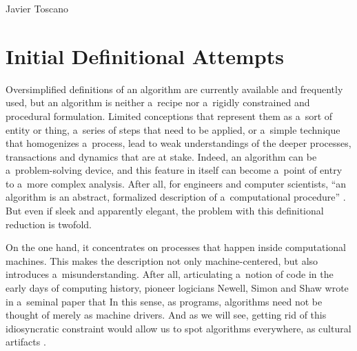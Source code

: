 \begin{artengenv}{Javier Toscano}
\section*{Initial Definitional Attempts}
Oversimplified definitions of an algorithm are currently available and frequently used, but an algorithm is neither a~recipe nor a~rigidly constrained and procedural formulation. Limited conceptions that represent them as a~sort of entity or thing, a~series of steps that need to be applied, or a~simple technique that homogenizes a~process, lead to weak understandings of the deeper processes, transactions and dynamics that are at stake. Indeed, an algorithm can be a~problem-solving device, and this feature in itself can become a~point of entry to a~more complex analysis. After all, for engineers and computer scientists, ``an algorithm is an abstract, formalized description of a~computational procedure''
\parencite[][p.3]{dourish_algorithms_2016}. %
 But even if sleek and apparently elegant, the problem with this definitional reduction is twofold.

On the one hand, it concentrates on processes that happen inside computational machines. This makes the description not only machine-centered, but also introduces a~misunderstanding. After all, articulating a~notion of code in the early days of computing history, pioneer logicians Newell, Simon and Shaw wrote in a~seminal paper that
 In this sense, as programs, algorithms need not be thought of merely as machine drivers. And as we will see, getting rid of this idiosyncratic constraint would allow us to spot algorithms everywhere, as cultural artifacts 
\parencites[][p.15]{finn_what_2017}[][]{seaver_algorithms_2017}.%



\end{artengenv}
